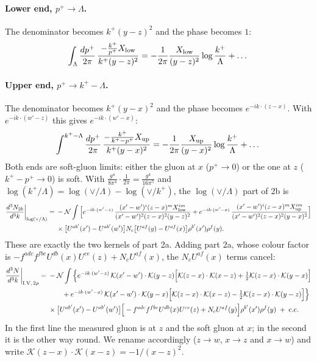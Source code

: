 \documentclass[10pt]{article}
\numberwithin{equation}{section}
\newcommand{\KK}{\mathcal K}
\newcommand{\NN}{\mathcal N}
\begin{document}
\paragraph{Lower end, $p^+\to\Lambda$.} The denominator becomes $k^+(y-z)^2$ and the phase becomes $1$:
\begin{equation}
\int_\Lambda\frac{dp^+}{2\pi}\,\frac{-\frac{k^+}{p^+}X_{\rm low}}{k^+(y-z)^2}=-\frac{1}{2\pi}\frac{X_{\rm low}}{(y-z)^2}\log\frac{k^+}{\Lambda}+\dots
\end{equation}
\paragraph{Upper end, $p^+\to k^+-\Lambda$.} The denominator becomes $k^+(y-x)^2$ and the phase becomes $e^{-ik\cdot(z-x)}$. With $e^{-ik\cdot(w'-z)}$ this gives $e^{-ik\cdot(w'-x)}$:
\begin{equation}
\int^{k^+-\Lambda}\frac{dp^+}{2\pi}\,\frac{-\frac{k^+}{k^+-p^+}X_{\rm up}}{k^+(y-x)^2}=-\frac1{2\pi}\frac{X_{\rm up}}{(y-x)^2}\log\frac{k^+}{\Lambda}+\dots
\end{equation}
Both ends are soft-gluon limits: either the gluon at $x$ ($p^+\to0$) or the one at $z$ ($k^+-p^+\to0$) is soft. With $\frac{g^4}{8\pi^4}\cdot\frac1{2\pi}=\frac{g^4}{16\pi^5}$ and $\log(k^+/\Lambda)=\log(\vee/\Lambda)-\log(\vee/k^+)$, the $\log(\vee/\Lambda)$ part of 2b is
\begin{align}
\frac{d^3N_{2b}}{d^3k}\bigg|_{\log(\vee/\Lambda)}={}&-\NN\int\Big[e^{-ik\cdot(w'-z)}\,\frac{(x'-w')^i(z-x)^m X^{im}_{\rm low}}{(x'-w')^2(z-x)^2(y-z)^2}+e^{-ik\cdot(w'-x)}\,\frac{(x'-w')^i(z-x)^m X^{im}_{\rm up}}{(x'-w')^2(z-x)^2(y-x)^2}\Big]\notag\\
&\times\big[U^{ab'}(x')-U^{ab'}(w')\big]N_c\big[U^{af}(y)-U^{af}(x)\big]\rho^{b'}(x')\rho^f(y).
\end{align}
These are exactly the two kernels of part 2a. Adding part 2a, whose colour factor is $-f^{adc}f^{fbe}U^{db}(x)U^{ce}(z)+N_cU^{af}(x)$, the $N_cU^{af}(x)$ terms cancel:
\begin{align}
\frac{d^3N}{d^3k}\bigg|_{\rm I.V,\,2\rho}={}&-\NN\int\Big\{e^{-ik\cdot(w'-z)}\,\KK(x'-w')\cdot\KK(y-z)\Big[\KK(z-x)\cdot\KK(x-z)+\tfrac12\KK(z-x)\cdot\KK(y-x)\Big]\notag\\
&\qquad+e^{-ik\cdot(w'-x)}\,\KK(x'-w')\cdot\KK(y-x)\Big[\KK(z-x)\cdot\KK(x-z)-\tfrac12\KK(z-x)\cdot\KK(y-z)\Big]\Big\}\notag\\
&\times\big[U^{ab'}(x')-U^{ab'}(w')\big]\Big[-f^{adc}f^{fbe}U^{db}(x)U^{ce}(z)+N_cU^{af}(y)\Big]\rho^{b'}(x')\rho^f(y)\;+\;{\rm c.c.}
\label{eq:rowV}
\end{align}
In the first line the measured gluon is at $z$ and the soft gluon at $x$; in the second it is the other way round. We rename accordingly ($z\to w$, $x\to z$ and $x\to w$) and write $\KK(z-x)\cdot\KK(x-z)=-1/(x-z)^2$.
\end{document}
